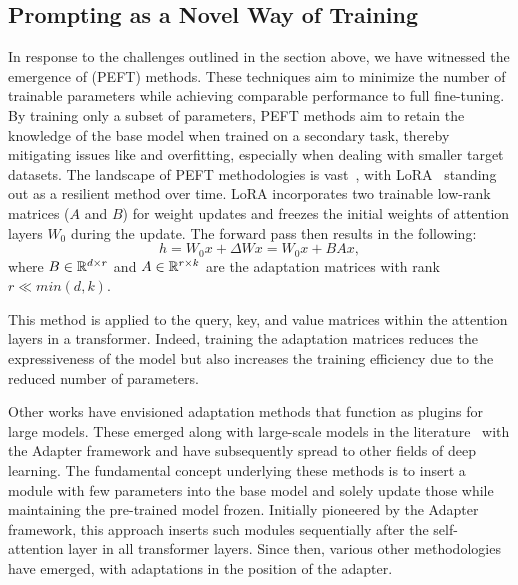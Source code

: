 \subsection{Prompting as a Novel Way of Training}

In response to the challenges outlined in the section above, we have witnessed the emergence of  (PEFT) methods. These techniques aim to minimize the number of trainable parameters while achieving comparable performance to full fine-tuning. By training only a subset of parameters, PEFT methods aim to retain the knowledge of the base model when trained on a secondary task, thereby mitigating issues like  and overfitting, especially when dealing with smaller target datasets. The landscape of PEFT methodologies is vast~, with LoRA~ standing out as a resilient method over time. LoRA incorporates two trainable low-rank matrices ($A$ and $B$) for weight updates and freezes the initial weights of attention layers $W_0$ during the update. The forward pass then results in the following:
\begin{equation*}
    h = W_0x + \Delta Wx = W_0x + BAx,
\end{equation*}
where $B\in\mathbb{R}^{d\times r}$ and $A\in\mathbb{R}^{r\times k}$ are the adaptation matrices with rank $r \ll min(d,k)$. 

This method is applied to the query, key, and value matrices within the attention layers in a transformer. Indeed, training the adaptation matrices reduces the expressiveness of the model but also increases the training efficiency due to the reduced number of parameters.

Other works have envisioned adaptation methods that function as plugins for large models. These emerged along with large-scale models in the  literature~ with the Adapter framework and have subsequently spread to other fields of deep learning. The fundamental concept underlying these methods is to insert a module with few parameters into the base model and solely update those while maintaining the pre-trained model frozen. Initially pioneered by the Adapter framework, this approach inserts such modules sequentially after the self-attention layer in all transformer layers. Since then, various other methodologies have emerged, with adaptations in the position of the adapter.

